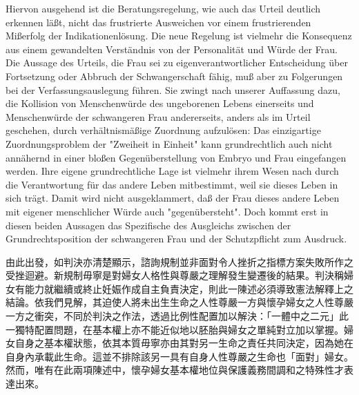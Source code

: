 \documentclass[12pt]{article}
\begin{document}
\begin{sourcepara}[title={原文SondervotumMS.276}]
Hiervon ausgehend ist die Beratungsregelung, wie auch das Urteil deutlich erkennen läßt, nicht das frustrierte Ausweichen vor einem frustrierenden Mißerfolg der Indikationenlösung. Die neue Regelung ist vielmehr die Konsequenz aus einem gewandelten Verständnis von der Personalität und Würde der Frau. Die Aussage des Urteils, die Frau sei zu eigenverantwortlicher Entscheidung über Fortsetzung oder Abbruch der Schwangerschaft fähig, muß aber zu Folgerungen bei der Verfassungsauslegung führen. Sie zwingt nach unserer Auffassung dazu, die Kollision von Menschenwürde des ungeborenen Lebens einerseits und Menschenwürde der schwangeren Frau andererseits, anders als im Urteil geschehen, durch verhältnismäßige Zuordnung aufzulösen: Das einzigartige Zuordnungsproblem der "Zweiheit in Einheit" kann grundrechtlich auch nicht annähernd in einer bloßen Gegenüberstellung von Embryo und Frau eingefangen werden. Ihre eigene grundrechtliche Lage ist vielmehr ihrem Wesen nach durch die Verantwortung für das andere Leben mitbestimmt, weil sie dieses Leben in sich trägt. Damit wird nicht ausgeklammert, daß der Frau dieses andere Leben mit eigener menschlicher Würde auch "gegenübersteht". Doch kommt erst in diesen beiden Aussagen das Spezifische des Ausgleichs zwischen der Grundrechtsposition der schwangeren Frau und der Schutzpflicht zum Ausdruck.
\end{sourcepara}
\begin{transpara}
由此出發，如判決亦清楚顯示，諮詢規制並非面對令人挫折之指標方案失敗所作之受挫迴避。新規制毋寧是對婦女人格性與尊嚴之理解發生變遷後的結果。判決稱婦女有能力就繼續或終止妊娠作成自主負責決定，則此一陳述必須導致憲法解釋上之結論。依我們見解，其迫使人將未出生生命之人性尊嚴一方與懷孕婦女之人性尊嚴一方之衝突，不同於判決之作法，透過比例性配置加以解決：「一體中之二元」此一獨特配置問題，在基本權上亦不能近似地以胚胎與婦女之單純對立加以掌握。婦女自身之基本權狀態，依其本質毋寧亦由其對另一生命之責任共同決定，因為她在自身內承載此生命。這並不排除該另一具有自身人性尊嚴之生命也「面對」婦女。然而，唯有在此兩項陳述中，懷孕婦女基本權地位與保護義務間調和之特殊性才表達出來。
\end{transpara}
\end{document}
